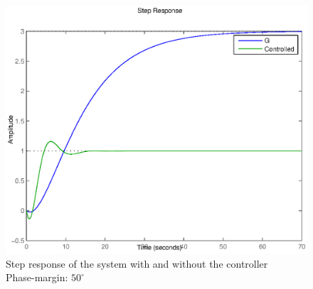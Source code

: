 \begin{figure}[h!t]
   \includegraphics[width=\columnwidth]{fig/step413.eps}
    \caption{Step response of the system with and without the controller \\ Phase-margin: $50^{\circ}$}
    \label{figstep413}
\end{figure}



